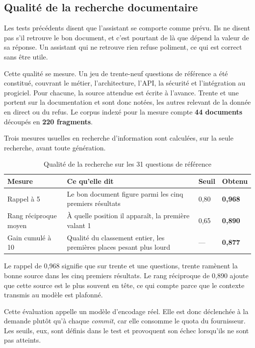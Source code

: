 \subsection{Qualité de la recherche documentaire}

Les tests précédents disent que l'assistant se comporte comme prévu. Ils ne disent pas s'il retrouve
le bon document, et c'est pourtant de là que dépend la valeur de sa réponse. Un assistant qui ne
retrouve rien refuse poliment, ce qui est correct sans être utile.

Cette qualité se mesure. Un jeu de trente-neuf questions de référence a été constitué, couvrant le
métier, l'architecture, l'API, la sécurité et l'intégration au progiciel. Pour chacune, la source
attendue est écrite à l'avance. Trente et une portent sur la documentation et sont donc notées, les
autres relevant de la donnée en direct ou du refus. Le corpus indexé pour la mesure compte
\textbf{44 documents} découpés en \textbf{220 fragments}.

Trois mesures usuelles en recherche d'information sont calculées, sur la seule recherche, avant toute
génération.

\begin{table}[H]
\centering
\caption{Qualité de la recherche sur les 31 questions de référence}\label{tab:eval-rag}
\begin{tabular}{L{3.2cm}L{7.4cm}C{1.8cm}C{1.8cm}}
\hline
{}
\textbf{Mesure} & \textbf{Ce qu'elle dit} & \textbf{Seuil} & \textbf{Obtenu} \\
\hline
Rappel à 5 & Le bon document figure parmi les cinq premiers résultats & 0,80 & \textbf{0,968} \\
\hline
Rang réciproque moyen & À quelle position il apparaît, la première valant 1 & 0,65 & \textbf{0,890} \\
\hline
Gain cumulé à 10 & Qualité du classement entier, les premières places pesant plus lourd & --- & \textbf{0,877} \\
\hline
\end{tabular}
\end{table}

Le rappel de 0,968 signifie que sur trente et une questions, trente ramènent la bonne source dans les
cinq premiers résultats. Le rang réciproque de 0,890 ajoute que cette source est le plus souvent en
tête, ce qui compte parce que le contexte transmis au modèle est plafonné.

Cette évaluation appelle un modèle d'encodage réel. Elle est donc déclenchée à la demande plutôt
qu'à chaque \emph{commit}, car elle consomme le quota du fournisseur. Les seuils, eux, sont définis
dans le test et provoquent son échec lorsqu'ils ne sont pas atteints.

